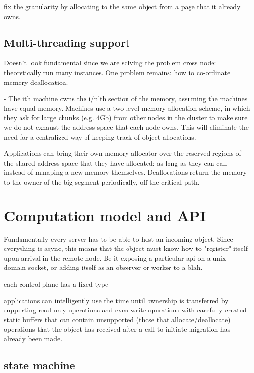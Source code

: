 fix the granularity by allocating to the same object from a page that it already owns.

\subsection{Multi-threading support}
Doesn't look fundamental since we are solving the problem cross node: theoretically run many instances.
One problem remains: how to co-ordinate memory deallocation. 

- The ith machine owns the i/n'th section of the memory, assuming the machines have equal memory.
Machines use a two level memory
allocation scheme, in which they ask for large chunks (e.g. 4Gb) from other nodes in the cluster to make sure we do not exhaust
the address space that each node owns. This will eliminate the need for a centralized way of keeping track of object allocations.


Applications can bring their own memory allocator over the reserved regions of the shared address space that they have allocated: as long as they can call instead of mmaping a new memory themselves.
Deallocations return the memory to the owner of the big segment periodically, off the critical path. 



\section{Computation model and API}

Fundamentally every server has to be able to host an incoming object.
Since everything is async, this means that the object must know how to
"register" itself upon arrival in the remote node. Be it exposing a particular
api on a unix domain socket, or adding itself as an observer or worker to a blah.

each control plane has a fixed type

applications can intelligently use the time until ownership is transferred by
supporting read-only operations and even write operations with carefully
created static buffers that can contain unsupported (those that allocate/deallocate)
operations that the object has received after a call to initiate migration has
already been made.


\subsection{state machine}

